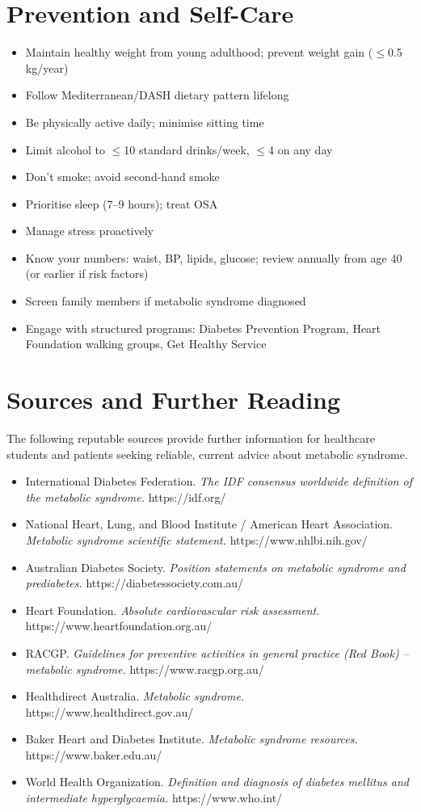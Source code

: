 \section*{Prevention and Self-Care}
\begin{itemize}
    \item Maintain healthy weight from young adulthood; prevent weight gain ($\le$0.5 kg/year)
    \item Follow Mediterranean/DASH dietary pattern lifelong
    \item Be physically active daily; minimise sitting time
    \item Limit alcohol to $\le$10 standard drinks/week, $\le$4 on any day
    \item Don't smoke; avoid second-hand smoke
    \item Prioritise sleep (7--9 hours); treat OSA
    \item Manage stress proactively
    \item Know your numbers: waist, BP, lipids, glucose; review annually from age 40 (or earlier if risk factors)
    \item Screen family members if metabolic syndrome diagnosed
    \item Engage with structured programs: Diabetes Prevention Program, Heart Foundation walking groups, Get Healthy Service
\end{itemize}

\section*{Sources and Further Reading}
The following reputable sources provide further information for healthcare students and patients seeking reliable, current advice about metabolic syndrome.

\begin{itemize}
    \item International Diabetes Federation. \textit{The IDF consensus worldwide definition of the metabolic syndrome.} https://idf.org/
    \item National Heart, Lung, and Blood Institute / American Heart Association. \textit{Metabolic syndrome scientific statement.} https://www.nhlbi.nih.gov/
    \item Australian Diabetes Society. \textit{Position statements on metabolic syndrome and prediabetes.} https://diabetessociety.com.au/
    \item Heart Foundation. \textit{Absolute cardiovascular risk assessment.} https://www.heartfoundation.org.au/
    \item RACGP. \textit{Guidelines for preventive activities in general practice (Red Book) -- metabolic syndrome.} https://www.racgp.org.au/
    \item Healthdirect Australia. \textit{Metabolic syndrome.} https://www.healthdirect.gov.au/
    \item Baker Heart and Diabetes Institute. \textit{Metabolic syndrome resources.} https://www.baker.edu.au/
    \item World Health Organization. \textit{Definition and diagnosis of diabetes mellitus and intermediate hyperglycaemia.} https://www.who.int/
\end{itemize}